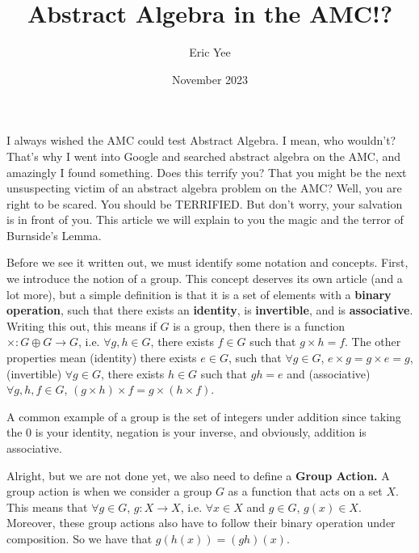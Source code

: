 \documentclass{article}
\title{Abstract Algebra in the AMC!?}
\author{Eric Yee}
\date{November 2023}
\begin{document}
\maketitle

I always wished the AMC could test Abstract Algebra. I mean, who wouldn't? That's why I went into Google and searched abstract algebra on the AMC, and amazingly I found something. Does this terrify you? That you might be the next unsuspecting victim of an abstract algebra problem on the AMC? Well, you are right to be scared. You should be TERRIFIED. But don't worry, your salvation is in front of you. This article we will explain to you the magic and the terror of Burnside's Lemma.

Before we see it written out, we must identify some notation and concepts. First, we introduce the notion of a group. This concept deserves its own article (and a lot more), but a simple definition is that it is a set of elements with a \textbf{binary operation}, such that there exists an \textbf{identity}, is \textbf{invertible}, and is \textbf{associative}. Writing this out, this means if $G$ is a group, then there is a function $\times: G\oplus G \rightarrow G$, i.e. $\forall g,h\in G$, there exists $f\in G$ such that $g\times h = f$. The other properties mean (identity) there exists $e\in G$, such that $\forall g\in G$, $e\times g=g\times e = g$, (invertible) $\forall g\in G$, there exists $h\in G$ such that $gh=e$ and (associative) $\forall g,h,f\in G$, $(g\times h)\times f =g\times (h\times f)$.

A common example of a group is the set of integers under addition since taking the $0$ is your identity, negation is your inverse, and obviously, addition is associative.

Alright, but we are not done yet, we also need to define a \textbf{Group Action.} A group action is when we consider a group $G$ as a function that acts on a set $X$. This means that $\forall g\in G$, $g: X\rightarrow X$, i.e. $\forall x\in X$ and $g\in G$, $g(x)\in X$. Moreover, these group actions also have to follow their binary operation under composition. So we have that $g(h(x)) = (gh)(x)$. 
\end{document}
